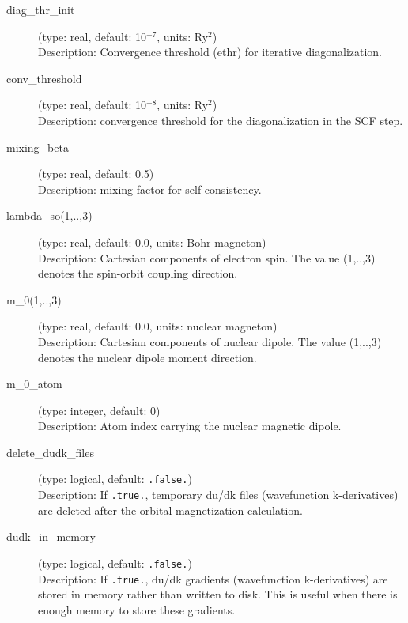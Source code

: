 \documentclass[a4paper,11pt,twoside]{article}
\begin{document}
\begin{description}
\item[diag\_thr\_init] (type: real, default: 10$^{-7}$, units: Ry$^2$)\\
Description: Convergence threshold (ethr) for iterative diagonalization.

\item[conv\_threshold] (type: real, default: 10$^{-8}$, units: Ry$^2$)\\
Description: convergence threshold for the diagonalization in the SCF step.

\item[mixing\_beta] (type: real, default: 0.5)\\
Description: mixing factor for self-consistency.

\item[lambda\_so(1,..,3)] (type: real, default: 0.0, units: Bohr magneton)\\
Description: Cartesian components of electron spin. The value (1,..,3) denotes the spin-orbit coupling direction.

\item[m\_0(1,..,3)] (type: real, default: 0.0, units: nuclear magneton)\\
Description: Cartesian components of nuclear dipole. The value (1,..,3) denotes the nuclear dipole moment direction.

\item[m\_0\_atom] (type: integer, default: 0)\\
Description: Atom index carrying the nuclear magnetic dipole.

\item[delete\_dudk\_files] (type: logical, default: \texttt{.false.})\\
Description: If \texttt{.true.}, temporary du/dk files (wavefunction k-derivatives) are deleted after the orbital magnetization calculation.

\item[dudk\_in\_memory] (type: logical, default: \texttt{.false.})\\
Description: If \texttt{.true.}, du/dk gradients (wavefunction k-derivatives) are stored in memory rather than written to disk. This is useful when there is enough memory to store these gradients.


\end{description}


\end{document}
